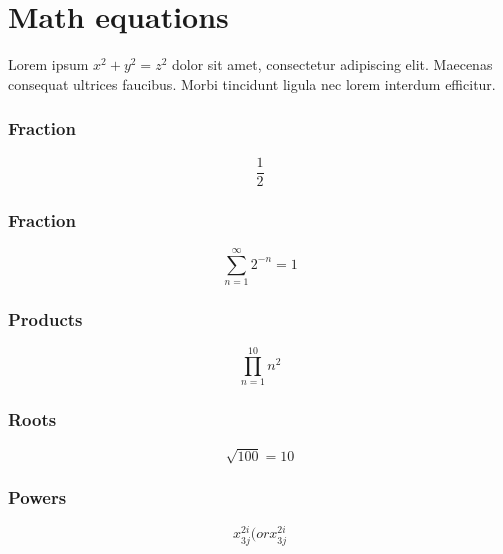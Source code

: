 \section{Math equations}
Lorem ipsum \(x^2 + y^2 = z^2\) dolor sit amet, consectetur adipiscing elit. Maecenas consequat ultrices faucibus. Morbi tincidunt ligula nec lorem interdum efficitur.

\subsubsection{Fraction}
\[ \frac{1}{2} \]

\subsubsection{Fraction}
\[ \sum_{n=1}^{\infty} 2^{-n} = 1 \]

\subsubsection{Products}
\[ \prod_{n=1}^{10} n^{2} \]

\subsubsection{Roots}
\[ \sqrt{100}=10 \]

\subsubsection{Powers}
\[ x^{2i}_{3j} (or x_{3j}^{2i} \]